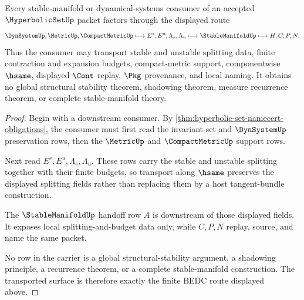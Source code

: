 \begin{theorem}
\label{thm:hyperbolic-set-splitting-transport}
Every stable-manifold or dynamical-systems consumer of an accepted
$\HyperbolicSetUp$ packet factors through the displayed route
$$
\DynSystemUp,\MetricUp,\CompactMetricUp
\longmapsto
E^s,E^u,\Lambda_s,\Lambda_u
\longmapsto
\StableManifoldUp
\longmapsto
H,C,P,N .
$$
Thus the consumer may transport stable and unstable splitting data, finite
contraction and expansion budgets, compact-metric support, componentwise
$\hsame$, displayed $\Cont$ replay, $\Pkg$ provenance, and local naming. It
obtains no global structural stability theorem, shadowing theorem, measure
recurrence theorem, or complete stable-manifold theory.
\end{theorem}
\begin{proof}
Begin with a downstream consumer. By
\autoref{thm:hyperbolic-set-namecert-obligations}, the consumer must first
read the invariant-set and $\DynSystemUp$ preservation rows, then the
$\MetricUp$ and $\CompactMetricUp$ support rows.

Next read $E^s,E^u,\Lambda_s,\Lambda_u$. These rows carry the stable and
unstable splitting together with their finite budgets, so transport along
$\hsame$ preserves the displayed splitting fields rather than replacing them
by a host tangent-bundle construction.

The $\StableManifoldUp$ handoff row $A$ is downstream of those displayed
fields. It exposes local splitting-and-budget data only, while $C,P,N$ replay,
source, and name the same packet.

No row in the carrier is a global structural-stability argument, a shadowing
principle, a recurrence theorem, or a complete stable-manifold construction.
The transported surface is therefore exactly the finite BEDC route displayed
above.
\end{proof}



